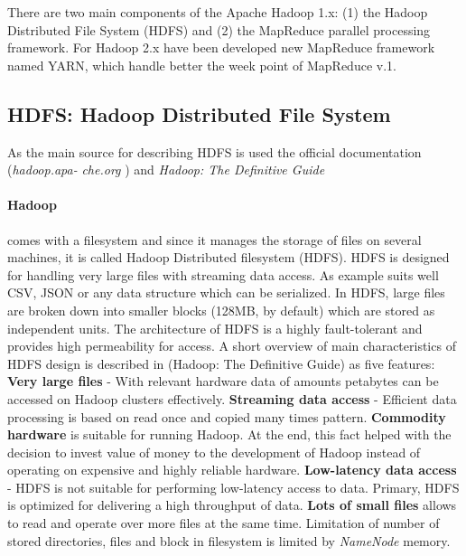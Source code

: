 \documentclass[a4paper,12pt,oneside]{report}
\begin{document}
	
	There are two main components of the Apache Hadoop 1.x: (1) the Hadoop
	Distributed File System 
	(HDFS) and (2) the MapReduce parallel processing framework. 	
	For Hadoop 2.x have been developed new MapReduce 
	framework named YARN, which handle better the week point of MapReduce v.1.
	
	
	\subsection{HDFS: Hadoop Distributed File System}\label{subsec:hdfs}
	As the main source for describing HDFS is used the official documentation
	(\textit{hadoop.apa-} \textit{che.org}
	\cite{hadoop_web}) and  \textit{Hadoop: The Definitive
		Guide}\cite{hadoop_definitive}
	
	\paragraph*{Hadoop} comes with a filesystem and since it manages the storage of
	files on several 
	machines, it is called Hadoop Distributed filesystem (HDFS). 
	HDFS is designed for handling very large files with streaming
	data access. As example suits well CSV, JSON or any data structure which can be
	serialized. \cite{hadoop_hdfs_web} In HDFS, large files are broken down into
	smaller blocks (128MB, by default) which are 
	stored as independent units. The architecture of HDFS is a highly fault-tolerant
	and provides high permeability for access.   
	A short overview of main characteristics of HDFS design is described in
	(Hadoop: The Definitive 
	Guide\cite{hadoop_definitive}) as five features: \textbf{Very large files} -
	With relevant hardware data of amounts petabytes 
	can be accessed on Hadoop clusters effectively. \textbf{Streaming data access} -
	Efficient data processing is based on
	read once and copied many times pattern. \textbf{Commodity hardware} is
	suitable for running Hadoop. At the end,
	this fact helped with the decision to invest value of money to the development
	of Hadoop instead 
	of operating on expensive and highly reliable hardware. \textbf{Low-latency
		data access} - HDFS is not suitable for performing
	low-latency access to data. Primary, HDFS is optimized for delivering
	a high throughput of data. \textbf{Lots of small files} allows to read and
	operate over more files
	at the same time. Limitation of number of stored directories,  files and block
	in filesystem is limited by \emph{NameNode} memory.
	
\end{document}

